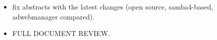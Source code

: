 \begin{itemize}
    \item fix abstracts with the latest changes (open source, samba4-based, adwebmanager compared).
    \item FULL DOCUMENT REVIEW.
\end{itemize}